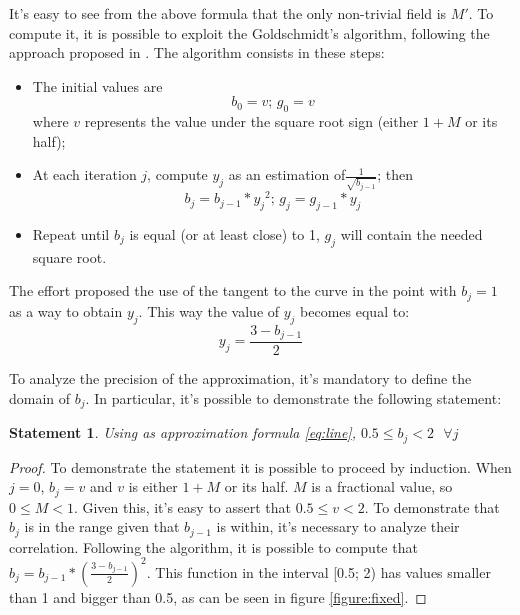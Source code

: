 \documentclass[paper=letter, fontsize=12pt]{article}
\newtheorem{theorem}{Statement}
\begin{document}
It's easy to see from the above formula that the only non-trivial field is \(M'\). To compute it, it is possible to exploit the Goldschmidt’s algorithm, following the approach proposed in \cite{markstein2004software}. The algorithm consists in these steps:
\begin{itemize}
    \item The initial values are
    \begin{equation}b_0 = v\mbox{; } g_0 = v \label{eq:algo_start}\end{equation}
    where \(v\) represents the value under the square root sign (either \(1+M\) or its half);
    \item At each iteration \(j\), compute \(y_j\) as an estimation of\(\frac{1}{\sqrt{b_{j-1}}}\); then \begin{equation}b_j = b_{j-1} * {y_j}^2\mbox{; } g_j = g_{j-1} * y_j
    \label{eq:algo_iterate}\end{equation}
    \item Repeat until \(b_j\) is equal (or at least close) to 1, \(g_j\) will contain the needed square root. 
\end{itemize}

The effort proposed the use of the tangent to the curve in the point with \(b_j = 1\) as a way to obtain \(y_j\). This way the value of \(y_j\) becomes equal to:
\begin{equation}
    \label{eq:line}
    y_j = \frac{3-b_{j-1}}{2}
\end{equation}

To analyze the precision of the approximation, it's mandatory to define the domain of \(b_j\). In particular, it's possible to demonstrate the following statement:

\begin{theorem}
    \label{domain}
    Using as approximation formula \ref{eq:line}, \(0.5 \le b_j < 2\mbox{ } \forall j\)
\end{theorem}

\begin{proof}
    To demonstrate the statement it is possible to proceed by induction. When \(j = 0\), \(b_j = v\) and \(v\) is either \(1+M\) or its half. \(M\) is a fractional value, so \(0 \le M < 1\). Given this, it's easy to assert that \(0.5 \le v < 2\).
    To demonstrate that \(b_j\) is in the range given that \(b_{j-1}\) is within, it's necessary to analyze their correlation. Following the algorithm, it is possible to compute that \(b_j = b_{j-1} * {\left(\frac{3 - b_{j-1}}{2}\right)}^2\). This function in the interval [0.5; 2) has values smaller than 1 and bigger than 0.5, as can be seen in figure \ref{figure:fixed}.
\end{proof}
\end{document}

